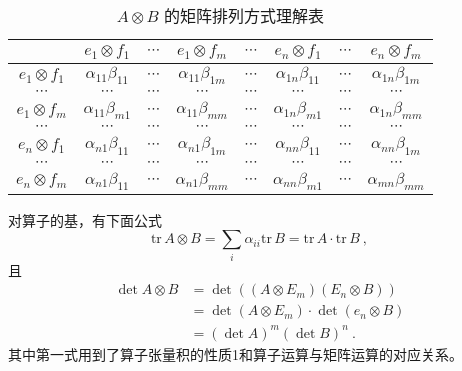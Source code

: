 \begin{table}[ht]
\centering
\caption{ $A\otimes B$ 的矩阵排列方式理解表}\label{tab_TPofLO_1}
\begin{tabular}{|c|c|c|c|c|c|c|c|}
\hline
 & $e_1\otimes f_1$ & $\cdots$ & $e_1\otimes f_m$ & $\cdots$ & $e_n\otimes f_1$ & $\cdots$ & $e_n\otimes f_m$ \\
\hline
$e_1\otimes f_1$ & $\alpha_{11}\beta_{11}$ & $\cdots$ & $\alpha_{11}\beta_{1m}$ & $\cdots$ & $\alpha_{1n}\beta_{11}$ & $\cdots$ & $\alpha_{1n}\beta_{1m}$ \\
\hline
$\cdots$ & $\cdots$ & $\cdots$ & $\cdots$ & $\cdots$ & $\cdots$ & $\cdots$ & $\cdots$ \\
\hline
$e_1\otimes f_m$ & $\alpha_{11}\beta_{m1}$ & $\cdots$ & $\alpha_{11}\beta_{mm}$ & $\cdots$ & $\alpha_{1n}\beta_{m1}$ & $\cdots$ & $\alpha_{1n}\beta_{mm}$ \\
\hline
$\cdots$ & $\cdots$ & $\cdots$ & $\cdots$ & $\cdots$ & $\cdots$ & $\cdots$ & $\cdots$ \\
\hline
$e_n\otimes f_1$ &  $\alpha_{n1}\beta_{11}$ & $\cdots$ & $\alpha_{n1}\beta_{1m}$ & $\cdots$ & $\alpha_{nn}\beta_{11}$ & $\cdots$ & $\alpha_{nn}\beta_{1m}$ \\
\hline
$\cdots$ & $\cdots$ & $\cdots$ & $\cdots$ & $\cdots$ & $\cdots$ & $\cdots$ & $\cdots$ \\
\hline
$e_n\otimes f_m$ & $\alpha_{n1}\beta_{11}$ & $\cdots$ & $\alpha_{n1}\beta_{mm}$ & $\cdots$ & $\alpha_{nn}\beta_{m1}$ & $\cdots$ & $\alpha_{mn}\beta_{mm}$\\
\hline
\end{tabular}
\end{table}

对算子的基，有下面公式
\begin{equation}
\mathrm{tr}\,A\otimes B=\sum_{i}\alpha_{ii}\mathrm{tr}\,B=\mathrm{tr}\,A\cdot\mathrm{tr}\,B~,
\end{equation}
且
\begin{equation}
\begin{aligned}
\det A\otimes B&=\det((A\otimes E_m)(E_n\otimes B))\\
&=\det(A\otimes E_m)\cdot\det(e_n\otimes B)\\
&=(\det A)^m(\det B)^n~.
\end{aligned}
\end{equation}
其中第一式用到了算子张量积的性质1和算子运算与矩阵运算的对应关系。
